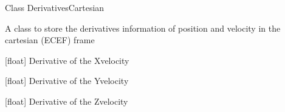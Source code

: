 \documentclass[letterpaper,10pt,english]{sphinxmanual}
\begin{document}
\begin{fulllineitems}
\label{\detokenize{modules:dynamics.DerivativesCartesian}}
\pysigstartsignatures
{}
\pysigstopsignatures
\sphinxAtStartPar
Class DerivativesCartesian

\sphinxAtStartPar
A class to store the derivatives information of position and velocity in the cartesian (ECEF) frame

\begin{fulllineitems}
\label{\detokenize{modules:dynamics.DerivativesCartesian.du}}
\pysigstartsignatures
{}
\pysigstopsignatures
\sphinxAtStartPar
{[}float{]} Derivative of the X\sphinxhyphen{}velocity

\end{fulllineitems}


\begin{fulllineitems}
\label{\detokenize{modules:dynamics.DerivativesCartesian.dv}}
\pysigstartsignatures
{}
\pysigstopsignatures
\sphinxAtStartPar
{[}float{]} Derivative of the Y\sphinxhyphen{}velocity

\end{fulllineitems}


\begin{fulllineitems}
\label{\detokenize{modules:dynamics.DerivativesCartesian.dw}}
\pysigstartsignatures
{}
\pysigstopsignatures
\sphinxAtStartPar
{[}float{]} Derivative of the Z\sphinxhyphen{}velocity


\end{fulllineitems}
\end{fulllineitems}
\end{document}
